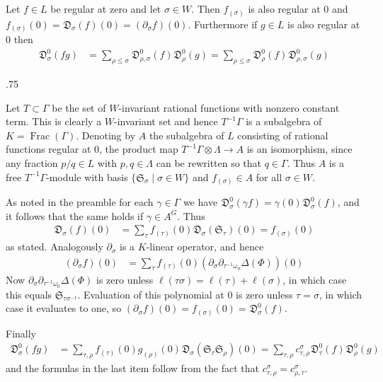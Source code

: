 \documentclass[11pt,fleqn]{amsart}
\makeatletter
\renewcommand\proofname{Proof}
\renewenvironment{proof}[1][\textit{\proofname}]{\par
 \pushQED{\qed}%
 \normalfont \topsep.75\paraskip\relax
 \trivlist
 \item[\hskip\labelsep
 \itshape
 #1\@addpunct{.}]\ignorespaces
}{%
 \popQED\endtrivlist\@endpefalse
}
\newcounter{para}[section]
\newcommand\ot{\otimes}
\renewcommand\to{\longrightarrow}
\newcommand\D[3]{{}^{#1} \mathfrak D_{#2}^{#3}}
\renewcommand\SS{\mathfrak S}
\DeclareMathOperator\Frac{Frac}
\makeatother
\begin{document}
\begin{Proposition}
Let $f \in L$ be regular at zero and let $\sigma \in W$. Then $f_{(\sigma)}$ 
is also regular at $0$ and $f_{(\sigma)}(0) = \D{}{\sigma}{}(f)(0) = 
(\partial_{\sigma} f)(0)$. Furthermore if $g \in L$ is also regular at $0$
then
\begin{align*}
\D{}{\sigma}{0}(fg)
	&= \sum_{\rho \leq \sigma} \D{}{\rho, \sigma}{0}(f) \D{}{\rho}{0}(g)
	= \sum_{\rho \leq \sigma} \D{}{\rho}{0}(f) \D{}{\rho, \sigma}{0}(g)
\end{align*}
\end{Proposition}
\begin{proof}
Let $T \subset \Gamma$ be the set of $W$-invariant rational functions with 
nonzero constant term. This is clearly a $W$-invariant set and hence 
$T^{-1} \Gamma$ is a subalgebra of $K = \Frac(\Gamma)$. Denoting by $A$ the 
subalgebra of $L$ consisting of rational functions regular at $0$, the product 
map $T^{-1} \Gamma \ot \Lambda \to A$ is an isomorphism, since any fraction 
$p/q \in L$ with $p,q \in \Lambda$ can be rewritten so that $q \in \Gamma$. 
Thus $A$ is a free $T^{-1}\Gamma$-module with basis $\{\SS_\sigma \mid \sigma 
\in W\}$ and $f_{(\sigma)} \in A$ for all $\sigma \in W$. 

As noted in the preamble for each $\gamma \in \Gamma$ we have 
$\D{}{\sigma}{0}(\gamma f) = \gamma(0) \D{}{\sigma}{0}(f)$, and it follows 
that the same holds if $\gamma \in A^G$. Thus
\begin{align*}
\D{}{\sigma}{}(f)(0)
	&= \sum_{\tau} f_{(\tau)}(0) \D{}{\sigma}{}(\SS_\tau)(0)
	= f_{(\sigma)}(0)
\end{align*}
as stated. Analogously $\partial_\sigma$ is a $K$-linear operator, and hence
\begin{align*}
(\partial_{\sigma} f)(0)
	&= \sum_{\tau} f_{(\tau)}(0) (\partial_{\sigma} 
		\partial_{\tau^{-1}\omega_0} \Delta(\Phi))(0)
\end{align*}
Now $\partial_{\sigma} \partial_{\tau^{-1}\omega_0} \Delta(\Phi)$ is 
zero unless $\ell(\tau \sigma) = \ell(\tau) + \ell(\sigma)$, in which case this
equals $\SS_{\tau\sigma^{-1}}$. Evaluation of this polynomial at $0$ is zero 
unless $\tau = \sigma$, in which case it evaluates to one, so 
$(\partial_{\sigma} f)(0) = f_{(\sigma)}(0) = \D{}{\sigma}{0}(f)$.

Finally
\begin{align*}
\D{}{\sigma}{0}(fg)
	&= \sum_{\tau, \rho} f_{(\tau)}(0) g_{(\rho)}(0) 
		\D{}{\sigma}{}(\SS_\tau \SS_\rho)(0) 
	= \sum_{\tau, \rho} c_{\tau, \rho}^\sigma \D{}{\tau}{0}(f) 
	\D{}{\rho}{0}(g)
\end{align*}
and the formulas in the last item follow from the fact that 
$c^\sigma_{\tau, \rho} = c^\sigma_{\rho, \tau}$.
\end{proof}
\end{document}
